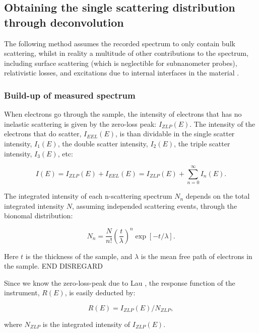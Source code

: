 \subsection{Obtaining the single scattering distribution through deconvolution} \label{sect_deconv}
The following method assumes the recorded spectrum to only contain bulk scattering, whilst in reality a multitude of other contributions to the spectrum, including surface scattering (which is neglectible for subnanometer probes\cite{brockt_lakner_2000}), relativistic losses, and excitations due to internal interfaces in the material \cite{potapov}.



\subsubsection{Build-up of measured spectrum}
When electrons go through the sample, the intensity of electrons that has no inelastic scattering is given by the zero-loss peak: $I_{ZLP}(E)$. The intensity of the electrons that do scatter, $I_{EEL}(E)$, is than dividable in the single scatter intensity, $I_1(E)$, the double scatter intensity, $I_2(E)$, the triple scatter intensity, $I_3(E)$, etc:

\begin{equation}\label{eq_I}
    I(E) = I_{ZLP}(E) + I_{EEL}(E) = I_{ZLP}(E) + \sum_{n=0}^\infty I_n(E).
\end{equation}


The integrated intensity of each n-scattering spectrum $N_n$  depends on the total integrated intensity $N$, assuming independed scattering events, through the bionomal distribution:

\begin{equation}\label{eq_N_n}
    N_n =  \frac{N}{n!} \left(\frac{t}{\lambda}\right)^n \exp{[-t/\lambda]} .
\end{equation}

Here $t$ is the thickness of the sample, and $\lambda$ is the mean free path of electrons in the sample. 
END DISREGARD

Since we know the zero-loss-peak due to Lau \cite{lau}, the response function of the instrument, $R(E)$, is easily deducted by:

\begin{equation}
    R(E) = I_{ZLP}(E)/N_{ZLP},
\end{equation}

where $N_{ZLP}$ is the integrated intensity of $I_{ZLP}(E)$. 


